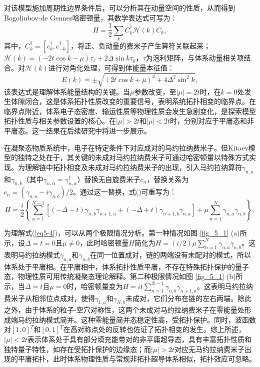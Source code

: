 对该模型施加周期性边界条件后，可以分析其在动量空间的性质，从而得到Bogoliubov-de Gennes哈密顿量，其数学表达式可写为：
\begin{equation}\label{eq5-2}
    H = \frac{1}{2} \sum_{k} C_{k}^{\dagger} \mathcal{H}(k) C_{k},
\end{equation}
其中，$C_{k}^{\dagger} = [c_{k}^{\dagger}, c_{-k}^{\dagger}]$，将正、负动量的费米子产生算符关联起来；$\mathcal{H}(k) = (-2t \cos k - \mu) \tau_{z} + 2\Delta \sin k \tau_{y}$，$\tau$为泡利矩阵，与体系动量相关项结合。对$\mathcal{H}(k)$进行对角化处理，可得到体能量本征值：
\begin{equation}\label{eq5-3}
    E(k) = \pm \sqrt{(2t \cos k + \mu)^{2} + 4\Delta^{2} \sin^{2} k},
\end{equation}
该表达式是理解体系能量结构的关键。当$\mu$参数改变，至$\vert \mu \vert = 2t$时，在$k = 0$处发生体隙闭合，这是体系拓扑性质改变的重要信号，表明系统拓扑相变的临界点。在临界点附近，体系电子态密度、输运性质等物理性质会发生急剧变化，是探索模型拓扑性质与相关参数设置的核心。在$\vert \mu \vert > 2t$和$\vert \mu \vert < 2t$时，分别对应于平庸态和非平庸态。这一结果在后续研究中将进一步展示。

在凝聚态物质系统中，电子在特定条件下对应成对的马约拉纳费米子。但Kitaev模型的独特之处在于，其关键的未成对马约拉纳费米子可通过哈密顿量以特殊方式实现。为理解链中拓扑相变及未成对马约拉纳费米子的出现，引入马约拉纳算符$\gamma_{n,a}$和$\gamma_{n,b}$（其中$\gamma_{n,\alpha} = \gamma_{n,\alpha}^{\dagger}$）替换无自旋费米子$c_{n}$，替换关系为$c_{n} = (\gamma_{n,a} - i\gamma_{n,b}) / 2$。通过这一替换，式()可重写为：
\begin{equation}\label{eq5-4}
    H = \frac{i}{2} \left\{ \sum_{n = 1}^{N - 1} [(-\Delta - t) \gamma_{n,b} \gamma_{n + 1,a} + (-\Delta + t) \gamma_{n + 1,b} \gamma_{n,a}] + \mu \sum_{n = 1}^{N} \gamma_{n,a} \gamma_{n,b} \right\},
\end{equation}

为理解式(\ref{eq5-4})，可以从两个极限情况分析。第一种情况如图 \ref{fig_5_1} (a)所示，设$\Delta = t = 0$且$\mu \neq 0$，此时哈密顿量$H$简化为$H = (i / 2) \mu \sum_{n = 1}^{N} \gamma_{n,a} \gamma_{n,b}$。这表明马约拉纳模式$\gamma_{n,a}$和$\gamma_{n,b}$在同一位置成对，链的两端没有未配对的模式，所以体系处于平庸相。在平庸相中，体系拓扑性质平庸，不存在特殊拓扑保护的量子态，物理性质可用传统凝聚态理论解释。第二种极限情况如图 \ref{fig_5_1} (b)所示，当$\Delta = t$且$\mu = 0$时，哈密顿量变为$H = it \sum_{n = 1}^{N - 1} \gamma_{n,b} \gamma_{n + 1,a}$。这表明马约拉纳费米子从相邻位点成对，使得$\gamma_{1,a}$和$\gamma_{N,b}$未成对，它们分布在链的左右两端。除此之外，由于体系的粒子-空穴对称性，这两个未成对马约拉纳费米子在零能量处形成端马约拉纳模式简并。这种零能量简并态稳定性高，受拓扑保护。同时，波函数对$[1, 0]^T$和$[0, 1]^T$在高对称点处的反转也佐证了拓扑相变的发生。综上所述，$\vert \mu \vert < 2t$表示体系处于具有部分填充能带对的非平庸超导态，具有丰富拓扑性质和独特量子特性，如存在受拓扑保护的边缘态；而$\vert \mu \vert > 2t$对应无马约拉纳费米子出现的平庸拓扑，此时体系物理性质与常规非拓扑超导体系相似，拓扑效应可忽略。 

